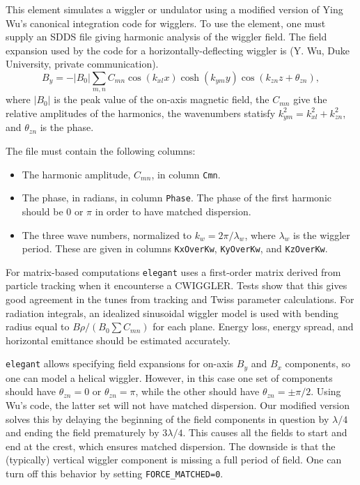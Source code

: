 This element simulates a wiggler or undulator using a modified version of Ying Wu's
canonical integration code for wigglers.  To use the element, one must
supply an SDDS file giving harmonic analysis of the wiggler field.
The field expansion used by the code for a horizontally-deflecting
wiggler is (Y. Wu, Duke University, private communication).
\begin{equation}
B_y = -\left|B_0\right| \sum_{m,n} C_{mn}\cos(k_{xl} x) \cosh (k_{ym} y)
\cos(k_{zn} z + \theta_{zn}),
\end{equation}
where $\left|B_0\right|$ is the peak value of the on-axis magnetic field,
the $C_{mn}$ give the relative amplitudes of the harmonics, the wavenumbers
statisfy $k^2_{ym} = k^2_{xl} + k^2_{zn}$, and $\theta_{zn}$ is the phase.

The file must contain the following columns:
\begin{itemize}
\item The harmonic amplitude, $C_{mn}$, in column {\tt Cmn}.
\item The phase, in radians, in column {\tt Phase}.  The phase of the first
harmonic should be 0 or $\pi$ in order to have matched dispersion.
\item The three wave numbers, normalized to $k_w = 2\pi/\lambda_w$, where
 $\lambda_w$ is the wiggler period.  These are given in columns 
 {\tt KxOverKw}, {\tt KyOverKw}, and {\tt KzOverKw}.
\end{itemize}

For matrix-based computations {\tt elegant} uses a first-order matrix
derived from particle tracking when it encounterse a CWIGGLER.  Tests
show that this gives good agreement in the tunes from tracking and
Twiss parameter calculations.  For radiation integrals, an idealized
sinusoidal wiggler model is used with bending radius equal to
$B\rho/(B_0 \sum C_{mn})$ for each plane.  Energy loss, energy spread,
and horizontal emittance should be estimated accurately.

{\tt elegant} allows specifying field expansions for on-axis $B_y$ and
$B_x$ components, so one can model a helical wiggler.  However, in this
case one set of components should have $\theta_{zn} = 0$ or $\theta_{zn}=\pi$,
while the other should have $\theta_{zn} = \pm \pi/2$.
Using Wu's code, the latter set will not have matched dispersion.  Our
modified version solves this by delaying the beginning of the field
components in question by $\lambda/4$ and ending the field prematurely
by $3\lambda/4$.  This causes all the fields to start and end at the
crest, which ensures matched dispersion.  The downside is that the
(typically) vertical wiggler component is missing a full period of
field.  One can turn off this behavior by setting \verb|FORCE_MATCHED=0|.

